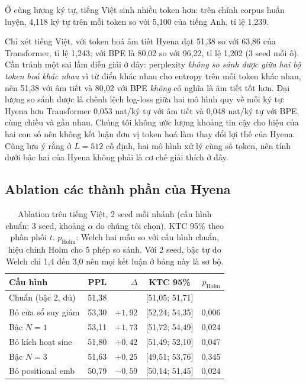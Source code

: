 \documentclass[11pt]{article}
\begin{document}
Ở cùng lượng ký tự, tiếng Việt sinh nhiều token hơn: trên chính corpus huấn
luyện, 4,118 ký tự trên mỗi token so với 5,100 của tiếng Anh, tỉ lệ 1,239.

Chỉ xét tiếng Việt, với token hoá âm tiết Hyena đạt 51,38 so với 63,86 của
Transformer, tỉ lệ 1,243; với BPE là 80,02 so với 96,22, tỉ lệ 1,202 (3 seed mỗi
ô). Cần tránh một sai lầm diễn giải ở đây: perplexity \emph{không so sánh được giữa hai
bộ token hoá khác nhau} vì từ điển khác nhau cho entropy trên mỗi token khác
nhau, nên 51,38 với âm tiết và 80,02 với BPE \emph{không} có nghĩa là âm tiết tốt
hơn. Đại lượng so sánh được là chênh lệch log-loss giữa hai mô hình quy về mỗi ký
tự: Hyena hơn Transformer 0,053 nat/ký tự với âm tiết và 0,048 nat/ký tự với
BPE, cùng chiều và gần nhau. Chúng tôi không ước lượng khoảng tin cậy cho hiệu
của hai con số nên không kết luận đơn vị token hoá làm thay đổi lợi thế của
Hyena. Cũng lưu ý rằng ở $L = 512$ cố định, hai mô hình xử lý cùng số token, nên
tính dưới bậc hai của Hyena không phải là cơ chế giải thích ở đây.

\subsection{Ablation các thành phần của Hyena}

\begin{table}[t]
\centering
\footnotesize
\setlength{\tabcolsep}{2pt}
\begin{tabular}{lrrcr}
\toprule
Cấu hình & PPL & $\Delta$ & KTC 95\% & $p_{\text{Holm}}$ \\
\midrule
Chuẩn (bậc 2, đủ) & 51,38 & & [51,05; 51,71] & \\
\midrule
Bỏ cửa sổ suy giảm & 53,30 & $+1{,}92$ & [52,24; 54,35] & 0,006 \\
Bậc $N = 1$        & 53,11 & $+1{,}73$ & [51,72; 54,49] & 0,024 \\
Bỏ kích hoạt sine  & 51,80 & $+0{,}42$ & [51,49; 52,10] & 0,047 \\
Bậc $N = 3$        & 51,63 & $+0{,}25$ & [49,51; 53,76] & 0,345 \\
Bỏ positional emb  & 50,79 & $-0{,}59$ & [50,14; 51,45] & 0,024 \\
\bottomrule
\end{tabular}
\caption{Ablation trên tiếng Việt, 2 seed mỗi nhánh (cấu hình chuẩn: 3 seed,
khoảng $\alpha$ do chúng tôi chọn). KTC 95\% theo phân phối $t$. $p_{\text{Holm}}$:
Welch hai mẫu so với cấu hình chuẩn, hiệu chỉnh Holm cho 5 phép so sánh. Với 2
seed, bậc tự do Welch chỉ 1,4 đến 3,0 nên mọi kết luận ở bảng này là sơ bộ.}
\label{tab:e3}
\end{table}
\end{document}
